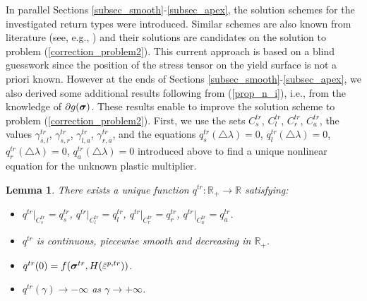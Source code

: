 \documentclass[a4paper,12pt]{article}
\newtheorem{lem}{Lemma}[section]
\theoremstyle{remark}
\newcommand{\mbf}[1]{\mbox{\boldmath$#1$}}
\numberwithin{equation}{section}
\begin{document}
In parallel Sections \ref{subsec_smooth}-\ref{subsec_apex}, the solution schemes for the investigated return types were introduced. Similar schemes are also known from literature (see,  e.g., \cite[Section 8]{NPO08}) and their solutions are candidates on the solution to problem (\ref{correction_problem2}). This current approach is based on a blind guesswork since the position of the stress tensor on the yield surface is not a priori known. However at the ends of Sections \ref{subsec_smooth}-\ref{subsec_apex}, we also derived some additional results following from (\ref{prop_n_i}), i.e., from the knowledge of $\partial g(\mbf\sigma)$. These results enable to improve the solution scheme to problem (\ref{correction_problem2}).  First, we use the sets $C^{tr}_s$, $C^{tr}_l$, $C^{tr}_r$, $C^{tr}_a$, the values $\gamma^{tr}_{s,l}$, $\gamma^{tr}_{s,r}$, $\gamma^{tr}_{l,a}$, $\gamma^{tr}_{r,a}$, and the equations $q_s^{tr}(\triangle\lambda)=0$, $q_l^{tr}(\triangle\lambda)=0$, $q_r^{tr}(\triangle\lambda)=0$, $q_a^{tr}(\triangle\lambda)=0$ introduced above to find a unique nonlinear equation for the unknown plastic multiplier.
\begin{lem}
There exists a unique function $q^{tr}:\mathbb R_+\rightarrow\mathbb R$ satisfying:
\begin{itemize}
\item[$(i)$] $q^{tr}|_{C^{tr}_s}=q^{tr}_s$, $q^{tr}|_{C^{tr}_l}=q^{tr}_l$, $q^{tr}|_{C^{tr}_r}=q^{tr}_r$, $q^{tr}|_{C^{tr}_a}=q^{tr}_a$.
\item[$(ii)$] $q^{tr}$ is continuous, piecewise smooth and decreasing in $\mathbb R_+$.
\item[$(iii)$] $q^{tr}(0)=f(\mbf{\sigma}^{tr},H(\bar{\varepsilon}^{p,tr}))$.
\item[$(iv)$] $q^{tr}(\gamma)\rightarrow-\infty$ as $\gamma\rightarrow+\infty$.
\end{itemize}
\label{lem_crucial}
\end{lem}
\end{document}
